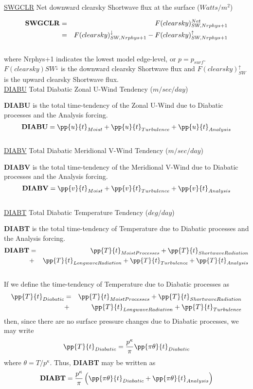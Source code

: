 \noindent
{ \underline {SWGCLR} Net downward clearsky Shortwave flux at the surface ($Watts/m^2$) }

\noindent
\begin{eqnarray*}
{\bf SWGCLR} & =  & F(clearsky)_{SW,Nrphys+1}^{Net} \\
             & =  & F(clearsky)_{SW,Nrphys+1}^\downarrow - F(clearsky)_{SW,Nrphys+1}^\uparrow
\end{eqnarray*}
\noindent
\\
where Nrphys+1 indicates the lowest model edge-level, or $p = p_{surf}$.
$F(clearsky){SW}^\downarrow$ is
the downward clearsky Shortwave flux and $F(clearsky)_{SW}^\uparrow$ is 
the upward clearsky Shortwave flux.
\\

\noindent
{ \underline {DIABU} Total Diabatic Zonal U-Wind Tendency  ($m/sec/day$) }

\noindent
{\bf DIABU} is the total time-tendency of the Zonal U-Wind due to Diabatic processes
and the Analysis forcing.
\[
{\bf DIABU} = \pp{u}{t}_{Moist} + \pp{u}{t}_{Turbulence} + \pp{u}{t}_{Analysis} 
\]
\\

\noindent
{ \underline {DIABV} Total Diabatic Meridional V-Wind Tendency  ($m/sec/day$) }

\noindent
{\bf DIABV} is the total time-tendency of the Meridional V-Wind due to Diabatic processes
and the Analysis forcing.
\[
{\bf DIABV} = \pp{v}{t}_{Moist} + \pp{v}{t}_{Turbulence} + \pp{v}{t}_{Analysis} 
\]
\\

\noindent
{ \underline {DIABT} Total Diabatic Temperature Tendency  ($deg/day$) }

\noindent
{\bf DIABT} is the total time-tendency of Temperature due to Diabatic processes
and the Analysis forcing.
\begin{eqnarray*}
{\bf DIABT} & = & \pp{T}{t}_{Moist Processes} + \pp{T}{t}_{Shortwave Radiation} \\
           & + & \pp{T}{t}_{Longwave Radiation} + \pp{T}{t}_{Turbulence} + \pp{T}{t}_{Analysis} 
\end{eqnarray*}
\\
If we define the time-tendency of Temperature due to Diabatic processes as
\begin{eqnarray*}
\pp{T}{t}_{Diabatic} & = & \pp{T}{t}_{Moist Processes} + \pp{T}{t}_{Shortwave Radiation} \\
                     & + & \pp{T}{t}_{Longwave Radiation} + \pp{T}{t}_{Turbulence}
\end{eqnarray*}
then, since there are no surface pressure changes due to Diabatic processes, we may write
\[
\pp{T}{t}_{Diabatic} = {p^\kappa \over \pi }\pp{\pi \theta}{t}_{Diabatic}
\]
where $\theta = T/p^\kappa$.  Thus, {\bf DIABT} may be written as
\[
{\bf DIABT} = {p^\kappa \over \pi } \left( \pp{\pi \theta}{t}_{Diabatic} + \pp{\pi \theta}{t}_{Analysis} \right)
\]
\\

